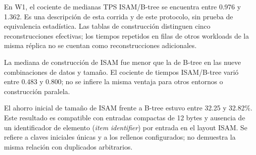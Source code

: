 \documentclass[11pt,a4paper]{article}
\begin{document}
\begin{table}[htbp]
\centering\small
\caption{Estado después de insertar exactamente un 10\% de filas; tamaños en MiB.}
\label{tab:after}
\end{table}

En W1, el cociente de medianas TPS ISAM/B-tree se encuentra entre 0.976 y 1.362.
Es una descripción de esta corrida y de este protocolo, sin prueba de
equivalencia estadística. Las tablas de construcción distinguen cinco
reconstrucciones efectivas; los tiempos repetidos en filas de otros workloads
de la misma réplica no se cuentan como reconstrucciones adicionales.

La mediana de construcción de ISAM fue menor que la de B-tree en las nueve
combinaciones de datos y tamaño. El cociente de tiempos ISAM/B-tree varió entre
0.483 y 0.800; no se infiere la misma ventaja para otros entornos o construcción
paralela.

El ahorro inicial de tamaño de ISAM frente a B-tree estuvo entre 32.25 y
32.82\%. Este resultado es compatible con entradas compactas de 12 bytes y
ausencia de un identificador de elemento (\textit{item identifier}) por entrada
en el layout ISAM. Se refiere a claves iniciales únicas y a los rellenos
configurados; no demuestra la misma relación con duplicados arbitrarios.
\end{document}
